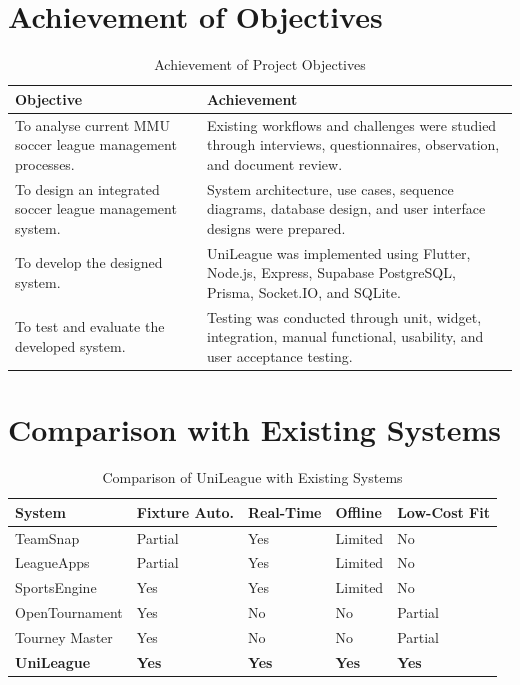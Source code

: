 \documentclass[12pt,a4paper]{report}
\begin{document}
\section{Achievement of Objectives}
\begin{table}[H]
\centering
\caption{Achievement of Project Objectives}
\begin{tabular}{p{6cm}p{8cm}}
\toprule
\textbf{Objective} & \textbf{Achievement}\\
\midrule
To analyse current MMU soccer league management processes. & Existing workflows and challenges were studied through interviews, questionnaires, observation, and document review.\\
To design an integrated soccer league management system. & System architecture, use cases, sequence diagrams, database design, and user interface designs were prepared.\\
To develop the designed system. & UniLeague was implemented using Flutter, Node.js, Express, Supabase PostgreSQL, Prisma, Socket.IO, and SQLite.\\
To test and evaluate the developed system. & Testing was conducted through unit, widget, integration, manual functional, usability, and user acceptance testing.\\
\bottomrule
\end{tabular}
\end{table}

\section{Comparison with Existing Systems}
\begin{table}[H]
\centering
\caption{Comparison of UniLeague with Existing Systems}
\begin{tabular}{p{3.2cm}p{2.5cm}p{2.8cm}p{2.5cm}p{3cm}}
\toprule
\textbf{System} & \textbf{Fixture Auto.} & \textbf{Real-Time} & \textbf{Offline} & \textbf{Low-Cost Fit}\\
\midrule
TeamSnap & Partial & Yes & Limited & No\\
LeagueApps & Partial & Yes & Limited & No\\
SportsEngine & Yes & Yes & Limited & No\\
OpenTournament & Yes & No & No & Partial\\
Tourney Master & Yes & No & No & Partial\\
\textbf{UniLeague} & \textbf{Yes} & \textbf{Yes} & \textbf{Yes} & \textbf{Yes}\\
\bottomrule
\end{tabular}
\end{table}
\end{document}
